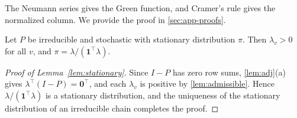 \documentclass[onefignum,onetabnum,nohypdvips]{siamart250211}
\numberwithin{theorem}{section}
\numberwithin{equation}{section}
\newcommand{\one}{\mathbf{1}}
\newcommand{\zero}{\mathbf{0}}
\begin{document}
The Neumann series gives the Green function, and Cramer's rule gives
the normalized column. We provide the proof in \cref{sec:app-proofs}.

\begin{lemma}\label{lem:stationary}
Let $P$ be irreducible and stochastic with stationary distribution
$\pi$. Then $\lambda_v>0$ for all $v$, and
$\pi=\lambda/(\one^{\top}\lambda)$.
\end{lemma}

\begin{proof}[Proof of Lemma~\ref{lem:stationary}]
Since $I-P$ has zero row sums, \cref{lem:adj}(a) gives
$\lambda^{\top}(I-P)=\zero^{\top}$, and each $\lambda_v$ is positive by
\cref{lem:admissible}. Hence $\lambda/(\one^{\top}\lambda)$ is a
stationary distribution, and the uniqueness of the stationary
distribution of an irreducible chain \cite[Ch.~1]{LevinPeres2017}
completes the proof.
\end{proof}
\end{document}
